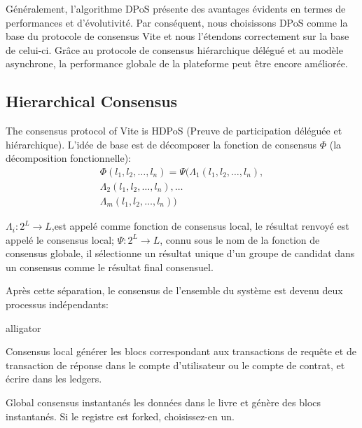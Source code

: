 \documentclass[UTF8,nofonts]{article}
\begin{document}
\begin{multicols}{2}
Généralement, l'algorithme DPoS présente des avantages évidents en termes de performances et d'évolutivité. Par conséquent, nous choisissons DPoS comme la base du protocole de consensus Vite et nous l'étendons correctement sur la base de celui-ci. Grâce au protocole de consensus hiérarchique délégué et au modèle asynchrone, la performance globale de la plateforme peut être encore améliorée.

\subsection{Hierarchical Consensus}
The consensus protocol of Vite is HDPoS (Preuve de participation déléguée et hiérarchique). L'idée de base est de décomposer la fonction de consensus $\Phi$ (la décomposition fonctionnelle):
\begin{equation}
\begin{split}
\Phi(l_1,l_2,\dots,l_n) = \Psi(\Lambda_1(l_1,l_2,\dots,l_n), \\
\Lambda_2(l_1,l_2,\dots,l_n),\dots \\
\Lambda_m(l_1,l_2,\dots,l_n))
\end{split}
\end{equation}

$\Lambda_i: 2^L \rightarrow L$,est appelé comme fonction de consensus local, le résultat renvoyé est appelé le consensus local; $\Psi: 2^L \rightarrow L$, connu sous le nom de la fonction de consensus globale, il sélectionne un résultat unique d'un groupe de candidat dans un consensus comme le résultat final consensuel.

Après cette séparation, le consensus de l'ensemble du système est devenu deux processus indépendants:
\begin{labeling}{alligator}
\item [Consensus local] générer les blocs correspondant aux transactions de requête et de transaction de réponse dans le compte d'utilisateur ou le compte de contrat, et écrire dans les ledgers.
\item [Global consensus] instantanés les données dans le livre et génère des blocs instantanés. Si le registre est forked, choisissez-en un.
\end{labeling}


\end{multicols}
\end{document}
